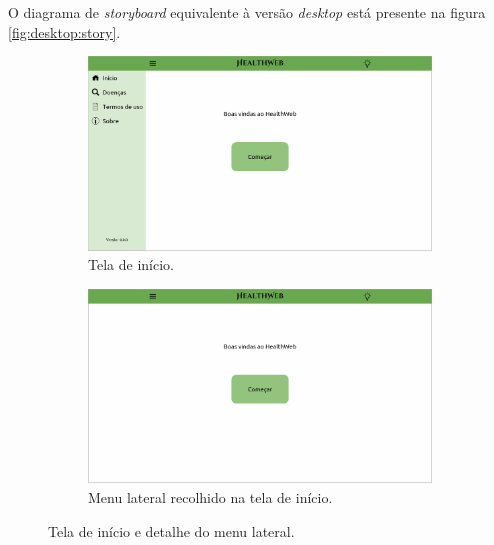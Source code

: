 O diagrama de \textit{storyboard} equivalente à versão \textit{desktop} está presente na figura \ref{fig:desktop:story}.

\begin{figure}[htbp]
	\centering
	\begin{subfigure}{0.49\linewidth}
		\centering
		\includegraphics[width=\linewidth]{figure/prototype/desktop/home.png}
		\caption{Tela de início.}
		\label{fig:desktop:home}
	\end{subfigure}
	\hfill
	\begin{subfigure}{0.49\linewidth}
		\centering
		\includegraphics[width=\linewidth]{figure/prototype/desktop/drawer.png}
		\caption{Menu lateral recolhido na tela de início.}
		\label{fig:desktop:drawer}
	\end{subfigure}
	\caption{Tela de início e detalhe do menu lateral.}
	\label{fig:desktop:home_agreeing}
\end{figure}

